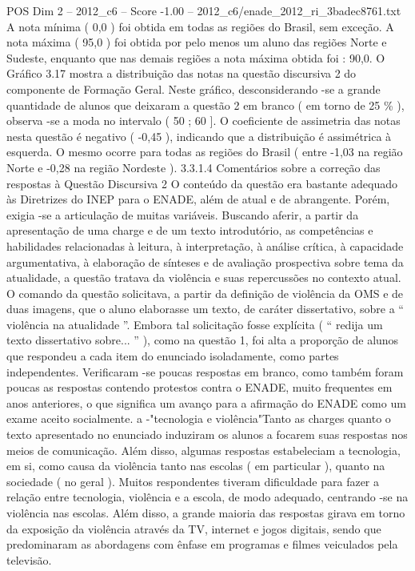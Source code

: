 \begin{textsample}{POS Dim 2 – 2012\_c6 – Score -1.00 – 2012\_c6/enade\_2012\_ri\_3badec8761.txt}
A nota mínima ( 0,0 ) foi obtida em todas as regiões do Brasil, sem exceção.
A nota máxima ( 95,0 ) foi obtida por pelo menos um aluno das regiões Norte e Sudeste, enquanto que nas demais regiões a nota máxima obtida foi : 90,0.
O Gráfico 3.17 mostra a distribuição das notas na questão discursiva 2 do componente de Formação Geral.
Neste gráfico, desconsiderando -se a grande quantidade de alunos que deixaram a questão 2 em branco ( em torno de 25 \% ), observa -se a moda no intervalo ( 50 ; 60 ].
O coeficiente de assimetria das notas nesta questão é negativo ( -0,45 ), indicando que a distribuição é assimétrica à esquerda.
O mesmo ocorre para todas as regiões do Brasil ( entre -1,03 na região Norte e -0,28 na região Nordeste ). 3.3.1.4 Comentários sobre a correção das respostas à Questão Discursiva 2 O conteúdo da questão era bastante adequado às Diretrizes do INEP para o ENADE, além de atual e de abrangente.
Porém, exigia -se a articulação de muitas variáveis.
Buscando aferir, a partir da apresentação de uma charge e de um texto introdutório, as competências e habilidades relacionadas à leitura, à interpretação, à análise crítica, à capacidade argumentativa, à elaboração de sínteses e de avaliação prospectiva sobre tema da atualidade, a questão tratava da violência e suas repercussões no contexto atual.
O comando da questão solicitava, a partir da definição de violência da OMS e de duas imagens, que o aluno elaborasse um texto, de caráter dissertativo, sobre a “ violência na atualidade ”.
Embora tal solicitação fosse explícita ( “ redija um texto dissertativo sobre... ” ), como na questão 1, foi alta a proporção de alunos que respondeu a cada item do enunciado isoladamente, como partes independentes.
Verificaram -se poucas respostas em branco, como também foram poucas as respostas contendo protestos contra o ENADE, muito frequentes em anos anteriores, o que significa um avanço para a afirmação do ENADE como um exame aceito socialmente. a -"tecnologia e violência"Tanto as charges quanto o texto apresentado no enunciado induziram os alunos a focarem suas respostas nos meios de comunicação.
Além disso, algumas respostas estabeleciam a tecnologia, em si, como causa da violência tanto nas escolas ( em particular ), quanto na sociedade ( no geral ).
Muitos respondentes tiveram dificuldade para fazer a relação entre tecnologia, violência e a escola, de modo adequado, centrando -se na violência nas escolas.
Além disso, a grande maioria das respostas girava em torno da exposição da violência através da TV, internet e jogos digitais, sendo que predominaram as abordagens com ênfase em programas e filmes veiculados pela televisão.

\end{textsample}
